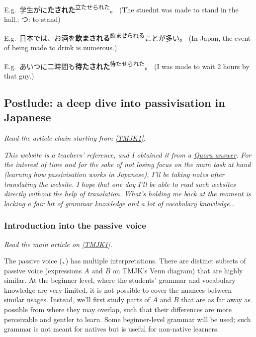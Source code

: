 \documentclass[../nihongo-gakushuu-kyouzai.tex]{subfiles}
\begin{document}
E.g.\ 学生がに\textbf{たされた}\textsuperscript{立たせられた}。 (The stuednt was made to stand in the hall.; つ: to stand)

E.g.\ 日本では、お酒を\textbf{飲まされる}\textsuperscript{飲ませられる}ことが多い。 (In Japan, the event of being made to drink is numerous.)

E.g.\ あいつに二時間も\textbf{待たされた}\textsuperscript{待たせられた}。 (I was made to wait 2 hours by that guy.)


\subsection{Postlude: a deep dive into passivisation in Japanese} \label{sec:passivisation}
\emph{Read the article chain starting from \href{https://www.tomojuku.com/blog/passive/}{[TMJK1]}.}

\emph{This website is a teachers' reference, and I obtained it from a \href{https://www.quora.com/Can-we-use-\%E8\%87\%AA\%E5\%8B\%95\%E8\%A9\%9E-verbs-in-passive-\%E5\%8F\%97\%E8\%BA\%AB\%E5\%BD\%A2-I-am-learning-Japanese-N4-level-and-it-is-too-difficult-for-me-to-understand-because-in-English-there-is-no-passive-form-for/answer/Badolo}{Quora answer}. For the interest of time and for the sake of not losing focus on the main task at hand (learning how passivisation works in Japanese), I'll be taking notes after translating the website. I hope that one day I'll be able to read such websites directly without the help of translation. What's holding me back at the moment is lacking a fair bit of grammar knowledge and a lot of vocabulary knowledge\dots}


\subsubsection{Introduction into the passive voice } \label{sec:tmjk-1-introduction-to-passive-voice}
\emph{Read the main article on \href{https://www.tomojuku.com/blog/passive/}{[TMJK1]}.}

The passive voice (、) has multiple interpretations. There are distinct subsets of passive voice (expressions $A$ and $B$ on TMJK's Venn diagram) that are highly similar. At the beginner level, where the students' grammar and vocabulary knowledge are very limited, it is not possible to cover the nuances between similar usages. Instead, we'll first study parts of $A$ and $B$ that are as far away as possible from where they may overlap, such that their differences are more perceivable and gentler to learn. Some beginner-level grammar will be used; such grammar is not meant for natives but is useful for non-native learners.
\end{document}
